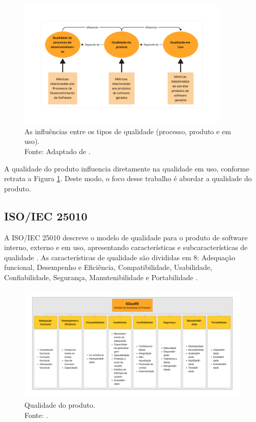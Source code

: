 \begin{figure}[H]
    \centering
    \includegraphics[width=0.9\textwidth]{figuras/quality_types.pdf}
    \vspace{-40pt}
    \caption{As influências entre os tipos de qualidade (processo, produto e em uso).\\
    Fonte: Adaptado de .}
    \label{fig:relacao-qualidades}
\end{figure}

A qualidade do produto influencia diretamente na qualidade em uso, conforme retrata a Figura \ref{fig:relacao-qualidades}. Deste modo, o foco desse trabalho é abordar a qualidade do produto.

\subsection{ISO/IEC 25010}

A ISO/IEC 25010 descreve o modelo de qualidade para o produto de software interno, externo e em uso, apresentando características e subcaracterísticas de qualidade . As características de qualidade são divididas em 8: Adequação funcional, Desempenho e Eficiência, Compatibilidade, Usabilidade, Confiabilidade, Segurança, Manutenibilidade e Portabilidade .

\begin{figure}[H]
    \centering
    \includegraphics[width=1.0\textwidth]{figuras/Untitled.pdf}
    \vspace{-25pt}
    \caption{Qualidade do produto.\\
    Fonte: .}
    \label{fig:qualidade-produto}
\end{figure}

